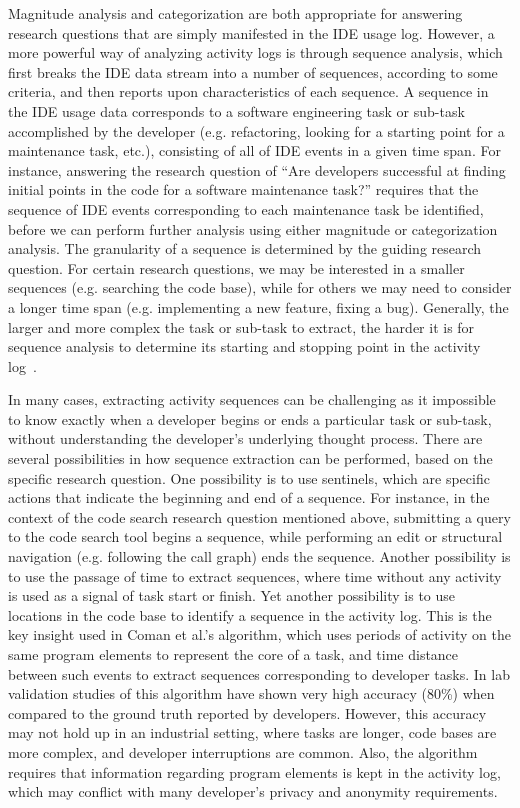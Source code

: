 Magnitude analysis and categorization are both appropriate for answering research questions that are simply manifested in the IDE usage log. However, a more powerful way of analyzing activity logs is through sequence analysis, which first breaks the IDE data stream into a number of sequences, according to some criteria, and then reports upon characteristics of each sequence. A sequence in the IDE usage data corresponds to a software engineering task or sub-task accomplished by the developer (e.g. refactoring, looking for a starting point for a maintenance task, etc.), consisting of all of IDE events in a given time span. For instance, answering the research question of ``Are developers successful at finding initial points in the code for a software maintenance task?'' requires that the sequence of IDE events corresponding to each maintenance task be identified, before we can perform further analysis using either magnitude or categorization analysis. The granularity of a sequence is determined by the guiding research question. For certain research questions, we may be interested in a smaller sequences (e.g. searching the code base), while for others we may need to consider a longer time span (e.g. implementing a new feature, fixing a bug). 
Generally, the larger and more complex the task or sub-task to extract, the harder it is for sequence analysis to determine its starting and stopping point in the activity log~\cite{Zou-ComanIndustry}.

In many cases, extracting activity sequences can be challenging as it impossible to know exactly when a developer begins or ends a particular task or sub-task, without understanding the developer's underlying thought process. There are several possibilities in how sequence extraction can be performed, based on the specific research question. One possibility is to use sentinels, which are specific actions that indicate the beginning and end of a sequence. For instance, in the context of the code search research question mentioned above, submitting a query to the code search tool begins a sequence, while performing an edit or structural navigation (e.g. following the call graph) ends the sequence. Another possibility is to use the passage of time to extract sequences, where time without any activity is used as a signal of task start or finish. Yet another possibility is to use locations in the code base to identify a sequence in the activity log. This is the key insight used in Coman et al.'s \cite{Coman-TaskIdent} algorithm, which uses periods of activity on the same program elements to represent the core of a task, and time distance between such events to extract sequences corresponding to developer tasks. In lab validation studies of this algorithm have shown very high accuracy (80\%) when compared to the ground truth reported by developers. However, this accuracy may not hold up in an industrial setting\cite{Zou-ComanIndustry}, where tasks are longer, code bases are more complex, and developer interruptions are common. Also, the algorithm requires that information regarding program elements is kept in the activity log, which may conflict with many developer's privacy and anonymity requirements.

